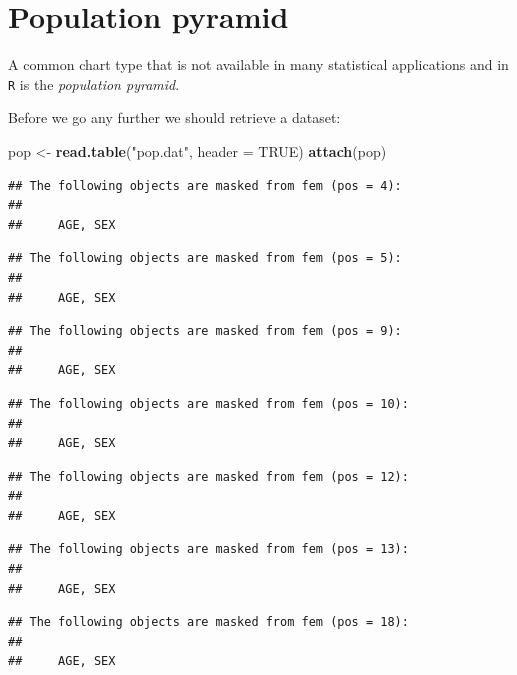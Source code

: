 \documentclass[12pt,a4paper]{book}
\newenvironment{Shaded}{\begin{snugshade}}{\end{snugshade}}
\newcommand{\KeywordTok}[1]{\textcolor[rgb]{0.13,0.29,0.53}{\textbf{#1}}}
\newcommand{\DataTypeTok}[1]{\textcolor[rgb]{0.13,0.29,0.53}{#1}}
\newcommand{\StringTok}[1]{\textcolor[rgb]{0.31,0.60,0.02}{#1}}
\newcommand{\OtherTok}[1]{\textcolor[rgb]{0.56,0.35,0.01}{#1}}
\newcommand{\NormalTok}[1]{#1}
\theoremstyle{definition}
\theoremstyle{definition}
\theoremstyle{definition}
\theoremstyle{remark}
\begin{document}
\hypertarget{population-pyramid}{%
\section{Population pyramid}\label{population-pyramid}}

A common chart type that is not available in many statistical
applications and in \texttt{R} is the \emph{population pyramid}.

Before we go any further we should retrieve a dataset:

\begin{Shaded}
\begin{Highlighting}[]
\NormalTok{pop <-}\StringTok{ }\KeywordTok{read.table}\NormalTok{(}\StringTok{"pop.dat"}\NormalTok{, }\DataTypeTok{header =} \OtherTok{TRUE}\NormalTok{)}
\KeywordTok{attach}\NormalTok{(pop)}
\end{Highlighting}
\end{Shaded}

\begin{verbatim}
## The following objects are masked from fem (pos = 4):
## 
##     AGE, SEX
\end{verbatim}

\begin{verbatim}
## The following objects are masked from fem (pos = 5):
## 
##     AGE, SEX
\end{verbatim}

\begin{verbatim}
## The following objects are masked from fem (pos = 9):
## 
##     AGE, SEX
\end{verbatim}

\begin{verbatim}
## The following objects are masked from fem (pos = 10):
## 
##     AGE, SEX
\end{verbatim}

\begin{verbatim}
## The following objects are masked from fem (pos = 12):
## 
##     AGE, SEX
\end{verbatim}

\begin{verbatim}
## The following objects are masked from fem (pos = 13):
## 
##     AGE, SEX
\end{verbatim}

\begin{verbatim}
## The following objects are masked from fem (pos = 18):
## 
##     AGE, SEX
\end{verbatim}
\end{document}
